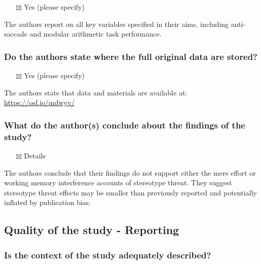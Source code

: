 \documentclass[
  doc, a4paper]{apa7}
\providecommand{\tightlist}{%
  \setlength{\itemsep}{0pt}\setlength{\parskip}{0pt}}
\begin{document}
\begin{itemize}
\tightlist
\item[$\boxtimes$]
  Yes (please specify)
\end{itemize}

The authors report on all key variables specified in their aims, including anti-saccade and modular arithmetic task performance.

\subsubsection{Do the authors state where the full original data are stored?}\label{do-the-authors-state-where-the-full-original-data-are-stored}

\begin{itemize}
\tightlist
\item[$\boxtimes$]
  Yes (please specify)
\end{itemize}

The authors state that data and materials are available at: \url{https://osf.io/mdwyv/}

\subsubsection{What do the author(s) conclude about the findings of the study?}\label{what-do-the-authors-conclude-about-the-findings-of-the-study}

\begin{itemize}
\tightlist
\item[$\boxtimes$]
  Details
\end{itemize}

The authors conclude that their findings do not support either the mere effort or working memory interference accounts of stereotype threat. They suggest stereotype threat effects may be smaller than previously reported and potentially inflated by publication bias.

\subsection{Quality of the study - Reporting}\label{quality-of-the-study---reporting}

\subsubsection{Is the context of the study adequately described?}\label{is-the-context-of-the-study-adequately-described}
\end{document}
